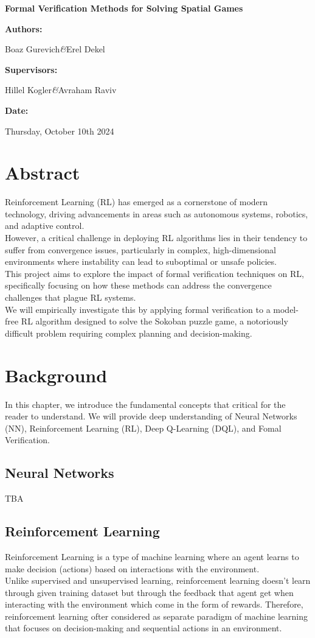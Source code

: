 \documentclass[12pt,a4paper]{report}
\newcommand{\projectname}{Formal Verification Methods for Solving Spatial Games}
\newcommand{\firstauthor}{Boaz Gurevich}
\newcommand{\secondauthor}{Erel Dekel}
\newcommand{\firstsupervisor}{Hillel Kogler}
\newcommand{\secondsupervisor}{Avraham Raviv}
\newcommand{\submissiondate}{Thursday, October 10th 2024}
\renewcommand{\maketitle}{
    \begin{titlepage}
        \centering
        \vspace*{2cm}
        
        {\huge\bfseries\projectname\par}
        \vspace{1.5cm}
        
        {\large\textbf{Authors:}\par}
        \vspace{0.5cm}
        {\large\firstauthor\hspace{0.3cm}\textit{\&}\hspace{0.3cm}\secondauthor\par}
        
        \vspace{2cm}
        
        {\large\textbf{Supervisors:}\par}
        \vspace{0.5cm}
        {\large\firstsupervisor\hspace{0.3cm}\textit{\&}\hspace{0.3cm}\secondsupervisor\par}
        
        \vspace{2cm}

        {\large\textbf{Date:}\par}
        \vspace{0.5cm}
        {\large\submissiondate\par}
    \end{titlepage}
}
\begin{document}
\hypersetup{
    linkcolor=blue,
    urlcolor=blue,
    linktoc=all
}

\maketitle

\chapter*{Abstract}
Reinforcement Learning (RL) has emerged as a cornerstone of modern technology, driving advancements in areas such as autonomous systems, robotics, and adaptive control.\\
However, a critical challenge in deploying RL algorithms lies in their tendency to suffer from convergence issues, particularly in complex, high-dimensional environments where instability can lead to suboptimal or unsafe policies.\\
This project aims to explore the impact of formal verification techniques on RL, specifically focusing on how these methods can address the convergence challenges that plague RL systems.\\
We will empirically investigate this by applying formal verification to a model-free RL algorithm designed to solve the Sokoban puzzle game, a notoriously difficult problem requiring complex planning and decision-making.\\

\tableofcontents

\chapter{Background}
In this chapter, we introduce the fundamental concepts that critical for the reader to understand.
We will provide deep understanding of Neural Networks (NN), Reinforcement Learning (RL), Deep Q-Learning (DQL), and Fomal Verification.
\section{Neural Networks}
TBA
\section{Reinforcement Learning}
Reinforcement Learning is a type of machine learning where an agent learns to make decision (actions) based on interactions with the environment.\\
Unlike supervised and unsupervised learning, reinforcement learning doesn't learn through given training dataset but through the feedback that agent get when interacting with the environment which come in the form of rewards. Therefore, reinforcement learning ofter considered as separate paradigm of machine learning that focuses on decision-making and sequential actions in an environment.
\end{document}
